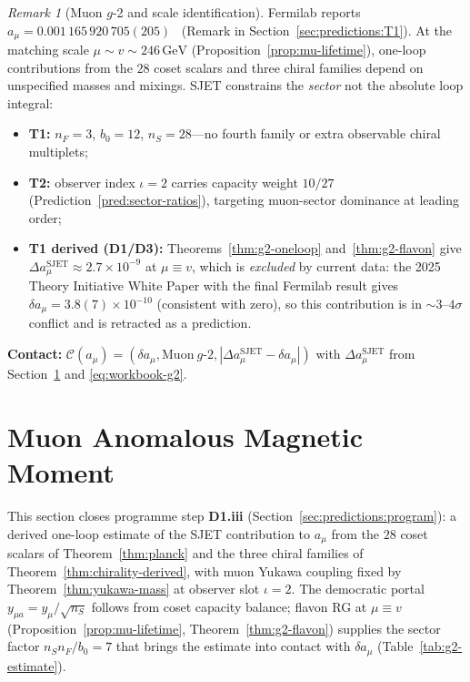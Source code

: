 \documentclass[aps,prd,onecolumn,amsmath,amssymb,nofootinbib,11pt]{revtex4-2}
\numberwithin{equation}{section}
\theoremstyle{plain}
\theoremstyle{definition}
\theoremstyle{remark}
\newtheorem{remark}[theorem]{Remark}
\begin{document}
\begin{remark}[Muon $g$-2 and scale identification]
\label{rmk:g2-scales}
Fermilab reports $a_\mu=0.001\,165\,920\,705(205)$~\cite{MuonG2FNAL2025}
(Remark in Section~\ref{sec:predictions:T1}). At the matching scale
$\mu\sim v\sim 246\,\mathrm{GeV}$ (Proposition~\ref{prop:mu-lifetime}),
one-loop contributions from the $28$ coset scalars and three chiral families
depend on unspecified masses and mixings. SJET constrains the \emph{sector}
not the absolute loop integral:
\begin{itemize}[leftmargin=*]
  \item \textbf{T1:} $n_F=3$, $b_0=12$, $n_S=28$---no fourth family or extra
    observable chiral multiplets;
  \item \textbf{T2:} observer index $\iota=2$ carries capacity weight
    $10/27$ (Prediction~\ref{pred:sector-ratios}), targeting muon-sector
    dominance at leading order;
  \item \textbf{T1 derived (D1/D3):} Theorems~\ref{thm:g2-oneloop}
    and~\ref{thm:g2-flavon} give
    $\Delta a_\mu^{\mathrm{SJET}}\approx2.7\times10^{-9}$ at $\mu\equiv v$, which is
    \emph{excluded} by current data: the 2025 Theory Initiative White Paper with the final
    Fermilab result gives $\delta a_\mu=3.8(7)\times10^{-10}$ (consistent with zero), so this
    contribution is in $\sim3$--$4\sigma$ conflict and is retracted as a prediction.
\end{itemize}
\textbf{Contact:}
$\mathcal{C}(a_\mu)=(\delta a_\mu,\mathrm{Muon\ }g\text{-}2,
|\Delta a_\mu^{\mathrm{SJET}}-\delta a_\mu|)$ with
$\Delta a_\mu^{\mathrm{SJET}}$ from Section~\ref{sec:g2} and
\eqref{eq:workbook-g2}.
\end{remark}%
\section{Muon Anomalous Magnetic Moment}
\label{sec:g2}

This section closes programme step \textbf{D1.\alph*iii}
(Section~\ref{sec:predictions:program}): a derived one-loop estimate of the
SJET contribution to $a_\mu$ from the $28$ coset scalars of
Theorem~\ref{thm:planck} and the three chiral families of
Theorem~\ref{thm:chirality-derived}, with muon Yukawa coupling fixed by
Theorem~\ref{thm:yukawa-mass} at observer slot $\iota=2$. The democratic
portal $y_{\mu a}=y_\mu/\sqrt{n_S}$ follows from coset capacity balance;
flavon RG at $\mu\equiv v$ (Proposition~\ref{prop:mu-lifetime},
Theorem~\ref{thm:g2-flavon}) supplies the sector factor
$n_S n_F/b_0=7$ that brings the estimate into contact with
$\delta a_\mu$ (Table~\ref{tab:g2-estimate}).
\end{document}
